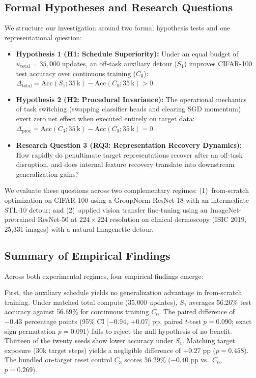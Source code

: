 \documentclass[sn-mathphys,Numbered]{sn-jnl}
\begin{document}
\subsection{Formal Hypotheses and Research Questions}\label{subsec:intro_hypotheses}

We structure our investigation around two formal hypothesis tests and one representational question:
\begin{itemize}
    \item \textbf{Hypothesis 1 (H1: Schedule Superiority):} Under an equal budget of $u_{\mathrm{total}} = 35{,}000$ updates, an off-task auxiliary detour ($S_1$) improves CIFAR-100 test accuracy over continuous training ($C_0$): $\Delta_{\mathrm{total}} = \mathrm{Acc}(S_1; 35\,\mathrm{k}) - \mathrm{Acc}(C_0; 35\,\mathrm{k}) > 0$.
    \item \textbf{Hypothesis 2 (H2: Procedural Invariance):} The operational mechanics of task switching (swapping classifier heads and clearing SGD momentum) exert zero net effect when executed entirely on target data: $\Delta_{\mathrm{proc}} = \mathrm{Acc}(C_3; 35\,\mathrm{k}) - \mathrm{Acc}(C_0; 35\,\mathrm{k}) = 0$.
    \item \textbf{Research Question 3 (RQ3: Representation Recovery Dynamics):} How rapidly do penultimate target representations recover after an off-task disruption, and does internal feature recovery translate into downstream generalization gains?
\end{itemize}
We evaluate these questions across two complementary regimes: (1)~from-scratch optimization on CIFAR-100 using a GroupNorm ResNet-18 with an intermediate STL-10 detour; and (2)~applied vision transfer fine-tuning using an ImageNet-pretrained ResNet-50 at $224 \times 224$ resolution on clinical dermoscopy (ISIC 2019, 25,331 images) with a natural Imagenette detour.

\subsection{Summary of Empirical Findings}\label{subsec:intro_contributions}

Across both experimental regimes, four empirical findings emerge:

First, the auxiliary schedule yields no generalization advantage in from-scratch training. Under matched total compute (35,000 updates), $S_1$ averages 56.26\% test accuracy against 56.69\% for continuous training $C_0$. The paired difference of $-0.43$ percentage points (95\% CI [$-0.94$, $+0.07$] pp, paired $t$-test $p = 0.090$; exact sign permutation $p = 0.091$) fails to reject the null hypothesis of no benefit. Thirteen of the twenty seeds show lower accuracy under $S_1$. Matching target exposure (30k target steps) yields a negligible difference of $+0.27$ pp ($p = 0.458$). The bundled on-target reset control $C_3$ scores 56.29\% ($-0.40$ pp vs.\ $C_0$, $p = 0.269$).
\end{document}
